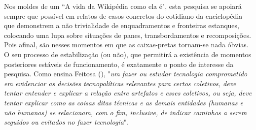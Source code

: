 Nos moldes de um “A vida da Wikipédia como ela é", esta pesquisa se apoiará sempre que possível em relatos de casos concretos do cotidiano da enciclopédia que demonstrem a não trivialidade de enquadramentos e fronteiras estanques, colocando uma lupa sobre situações de panes, transbordamentos e recomposições. Pois afinal, são nesses momentos em que as caixas-pretas tornam-se nada óbvias. O seu processo de estabilização (ou não), que permitirá a existência de momentos posteriores estáveis de funcionamento, é exatamente o ponto de interesse da pesquisa. Como ensina Feitosa (\citeyear[p.9]{feitosa_cidadao_2010}), "\textit{um fazer ou estudar tecnologia comprometido em evidenciar as decisões tecnopolíticas relevantes para certos coletivos, deve tentar entender e explicar a relação entre artefatos e esses coletivos, ou seja, deve tentar explicar como as coisas ditas técnicas e as demais entidades (humanas e não humanas) se relacionam, com o fim, inclusive, de indicar caminhos a serem seguidos ou evitados no fazer tecnologia}".
